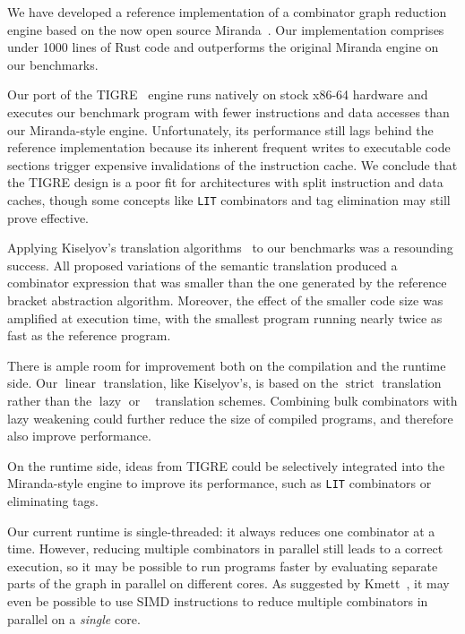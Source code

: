 \documentclass[conference]{IEEEtran}
\DeclareMathOperator{\strict}{strict}
\DeclareMathOperator{\lazy}{lazy}
\DeclareMathOperator{\lazyeta}{lazy_\eta}
\DeclareMathOperator{\linear}{linear}
\begin{document}
We have developed a reference implementation of a combinator graph reduction engine based on the now open source Miranda~\cite{turner_new_1979}.
Our implementation comprises under 1000 lines of Rust code and outperforms the original Miranda engine on our benchmarks.

Our port of the TIGRE~\cite{koopman_fresh_1989} engine runs natively on stock x86-64 hardware and executes our benchmark program with fewer instructions and data accesses than our Miranda-style engine.
Unfortunately, its performance still lags behind the reference implementation because its inherent frequent writes to executable code sections trigger expensive invalidations of the instruction cache.
We conclude that the TIGRE design is a poor fit for architectures with split instruction and data caches, though some concepts like \texttt{LIT} combinators and tag elimination may still prove effective.

Applying Kiselyov's translation algorithms~\cite{kiselyov_lambda_2018} to our benchmarks was a resounding success.
All proposed variations of the semantic translation produced a combinator expression that was smaller than the one generated by the reference bracket abstraction algorithm.
Moreover, the effect of the smaller code size was amplified at execution time, with the smallest program running nearly twice as fast as the reference program.

There is ample room for improvement both on the compilation and the runtime side.
Our $\linear$ translation, like Kiselyov's, is based on the $\strict$ translation rather than the $\lazy$ or $\lazyeta$ translation schemes.
Combining bulk combinators with lazy weakening could further reduce the size of compiled programs, and therefore also improve performance.

On the runtime side, ideas from TIGRE could be selectively integrated into the Miranda-style engine to improve its performance, such as \texttt{LIT} combinators or eliminating tags.

Our current runtime is single-threaded: it always reduces one combinator at a time.
However, reducing multiple combinators in parallel still leads to a correct execution, so it may be possible to run programs faster by evaluating separate parts of the graph in parallel on different cores.
As suggested by Kmett~\cite{kmett_combinators_2018}, it may even be possible to use SIMD instructions to reduce multiple combinators in parallel on a \emph{single} core.
\end{document}

